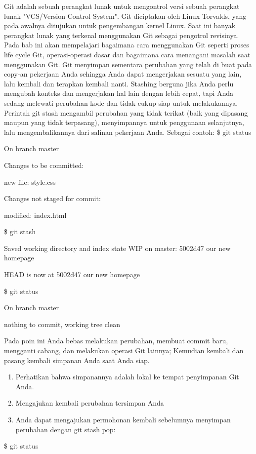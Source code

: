 \documentclass[12pt,a4paper]{article}
\begin{document}
Git adalah sebuah perangkat lunak untuk mengontrol versi sebuah 
perangkat lunak "VCS/Version Control System". Git diciptakan oleh Linux 
Torvalds, yang pada awalnya ditujukan untuk pengembangan kernel Linux. 
Saat ini banyak perangkat lunak yang terkenal menggunakan Git sebagai 
pengotrol revisinya.
\vspace{12pt}
Pada bab ini akan mempelajari bagaimana cara menggunakan Git seperti 
proses life cycle Git, operasi-operasi dasar dan bagaimana cara 
menangani masalah saat menggunakan Git.
\vspace{12pt}
Git menyimpan sementara perubahan yang telah di buat pada copy-an 
pekerjaan Anda sehingga Anda dapat mengerjakan sesuatu yang lain, lalu 
kembali dan terapkan kembali nanti. Stashing berguna jika Anda perlu 
mengubah konteks dan mengerjakan hal lain dengan lebih cepat, tapi Anda 
sedang melewati perubahan kode dan tidak cukup siap untuk melakukannya. 
\vspace{12pt}
Perintah git stash mengambil perubahan yang tidak terikat (baik yang 
dipasang maupun yang tidak terpasang), menyimpannya untuk penggunaan 
selanjutnya, lalu mengembalikannya dari salinan pekerjaan Anda. Sebagai 
contoh:
\vspace{12pt}
\$ git status

On branch master

Changes to be committed:

new file: style.css

Changes not staged for commit:

modified: index.html

\$ git stash

Saved working directory and index state WIP on master: 5002d47 our new 
homepage

HEAD is now at 5002d47 our new homepage

\$ git status

On branch master

nothing to commit, working tree clean

Pada poin ini Anda bebas melakukan perubahan, membuat commit baru, 
mengganti cabang, dan melakukan operasi Git lainnya; Kemudian kembali 
dan pasang kembali simpanan Anda saat Anda siap.
\vspace{12pt}
\begin{enumerate}
\item Perhatikan bahwa simpanannya adalah lokal ke tempat penyimpanan 
Git Anda. 
\item Mengajukan kembali perubahan tersimpan Anda
\item Anda dapat mengajukan permohonan kembali sebelumnya menyimpan 
perubahan dengan git stash pop:
\setcounter{numberedCntD}{\theenumi}
\end{enumerate}
\$ git status
\end{document}
